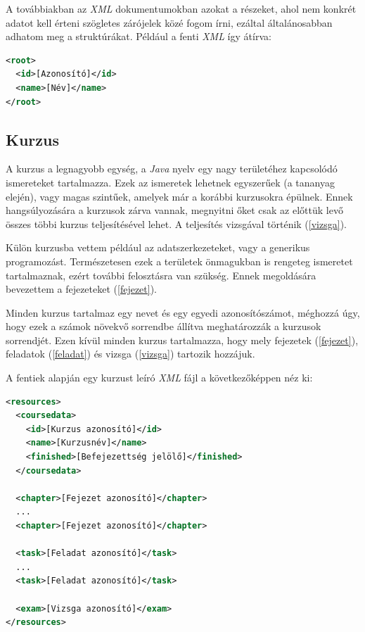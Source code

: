 \documentclass[12pt,a4paper]{article}
\newcommand{\xml}{\textit{XML}\xspace}
\begin{document}
	A továbbiakban az \xml dokumentumokban azokat a részeket, ahol nem konkrét adatot kell érteni szögletes zárójelek közé fogom írni, ezáltal általánosabban adhatom meg a struktúrákat. Például a fenti \xml így átírva:
	
	\bigskip
	\begin{lstlisting}[language=XML]
<root>
  <id>[Azonosító]</id>
  <name>[Név]</name>
</root>
	\end{lstlisting}
	
	\subsection{Kurzus}
	\bigskip
	
	A kurzus a legnagyobb egység, a \textit{Java} nyelv egy nagy területéhez kapcsolódó ismereteket tartalmazza. Ezek az ismeretek lehetnek egyszerűek (a tananyag elején), vagy magas szintűek, amelyek már a korábbi kurzusokra épülnek. Ennek hangsúlyozására a kurzusok zárva vannak, megnyitni őket csak az előttük levő összes többi kurzus teljesítésével lehet. A teljesítés vizsgával történik (\ref{vizsga}).
	
	Külön kurzusba vettem például az adatszerkezeteket, vagy a generikus programozást. Természetesen ezek a területek önmagukban is rengeteg ismeretet tartalmaznak, ezért további felosztásra van szükség. Ennek megoldására bevezettem a fejezeteket (\ref{fejezet}).
	
	Minden kurzus tartalmaz egy nevet és egy egyedi azonosítószámot, méghozzá úgy, hogy ezek a számok növekvő sorrendbe állítva meghatározzák a kurzusok sorrendjét.
	Ezen kívül minden kurzus tartalmazza, hogy mely fejezetek (\ref{fejezet}), feladatok (\ref{feladat}) és vizsga (\ref{vizsga}) tartozik hozzájuk.
	
	A fentiek alapján egy kurzust leíró \xml fájl a következőképpen néz ki:
	
	\bigskip
	\begin{lstlisting}[language=XML]
<resources>
  <coursedata>
    <id>[Kurzus azonosító]</id>
    <name>[Kurzusnév]</name>
    <finished>[Befejezettség jelölő]</finished>
  </coursedata>
  
  <chapter>[Fejezet azonosító]</chapter>
  ...
  <chapter>[Fejezet azonosító]</chapter>
  
  <task>[Feladat azonosító]</task>
  ...
  <task>[Feladat azonosító]</task>
  
  <exam>[Vizsga azonosító]</exam>
</resources>
	\end{lstlisting}
	\bigskip
	
\end{document}
